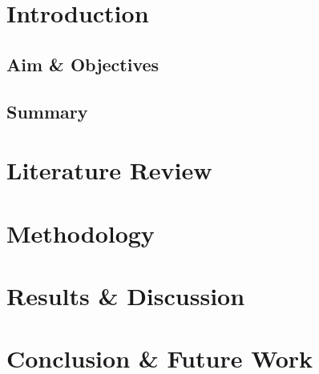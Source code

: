 \documentclass[12pt]{article}
\begin{document}
\section{Introduction}
\subsection{Aim \& Objectives}
\subsection{Summary}




\section{Literature Review}




\section{Methodology}




\section{Results \& Discussion}




\section{Conclusion \& Future Work}




\singlespacing


\end{document}
